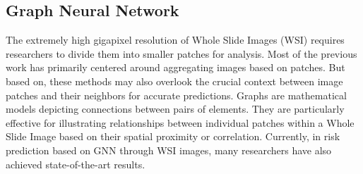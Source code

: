 \documentclass[journal,twoside,web]{ieeecolor}
\begin{document}
\subsection{Graph Neural Network}
The extremely high gigapixel resolution of Whole Slide Images (WSI) requires researchers to divide them into smaller patches for analysis. Most of the previous work has primarily centered around aggregating images based on patches. But based on\cite{levy2020topological}, these methods may also overlook the crucial context between image patches and their neighbors for accurate predictions. Graphs are mathematical models depicting connections between pairs of elements. They are particularly effective for illustrating relationships between individual patches within a Whole Slide Image based on their spatial proximity or correlation. Currently, in risk prediction based on GNN through WSI images, many researchers have also achieved state-of-the-art results.
\end{document}
